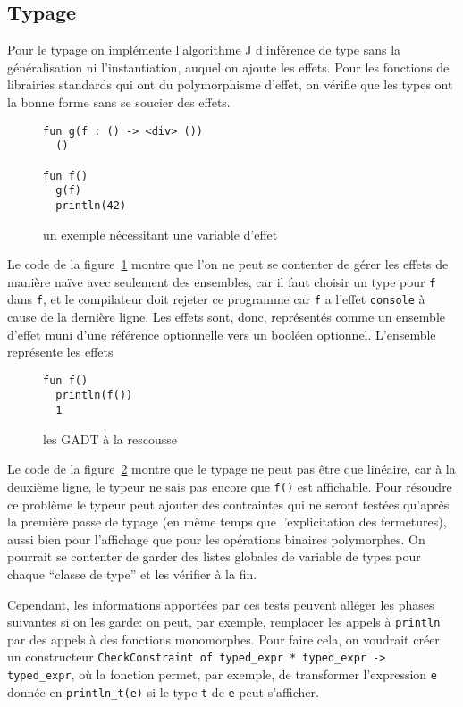 \documentclass[11pt]{article}
\begin{document}
\subsection{Typage}
Pour le typage on implémente l'algorithme J d'inférence de type sans la
généralisation ni l'instantiation, auquel on ajoute les effets. Pour les
fonctions de librairies standards qui ont du polymorphisme d'effet, on vérifie
que les types ont la bonne forme sans se soucier des effets.

\begin{figure}[h]\label{code2}
\begin{verbatim}
fun g(f : () -> <div> ())
  ()

fun f()
  g(f)
  println(42)
\end{verbatim}
\caption{un exemple nécessitant une variable d'effet}
\end{figure}

Le code de la figure~\ref{code2} montre que l'on ne peut se contenter de gérer
les effets de manière naïve avec seulement des ensembles, car il faut choisir un
type pour \texttt{f} dans \texttt{f}, et le compilateur doit rejeter ce
programme car \texttt{f} a l'effet \texttt{console} à cause de la dernière
ligne. Les effets sont, donc, représentés comme un ensemble d'effet muni d'une
référence optionnelle vers un booléen optionnel. L'ensemble représente les
effets

\begin{figure}[h]\label{code1}
\begin{verbatim}
fun f()
  println(f())
  1
\end{verbatim}
\caption{les GADT à la rescousse}
\end{figure}

Le code de la figure~\ref{code1} montre que le typage ne peut pas être que
linéaire, car à la deuxième ligne, le typeur ne sais pas encore que \texttt{f()}
est affichable. Pour résoudre ce problème le typeur peut ajouter des contraintes
qui ne seront testées qu'après la première passe de typage (en même temps que
l'explicitation des fermetures), aussi bien pour l'affichage que pour les
opérations binaires polymorphes. On pourrait se contenter de garder des listes
globales de variable de types pour chaque ``classe de type'' et les vérifier à
la fin.

Cependant, les informations apportées par ces tests peuvent alléger les phases
suivantes si on les garde: on peut, par exemple, remplacer les appels à
\texttt{println} par des appels à des fonctions monomorphes. Pour faire cela, on
voudrait créer un constructeur \texttt{CheckConstraint of typed\_expr *
  typed\_expr -> typed\_expr}, où la fonction permet, par exemple, de
transformer l'expression \texttt{e} donnée en \texttt{println\_t(e)} si le type
\texttt{t} de \texttt{e} peut s'afficher.
\end{document}
